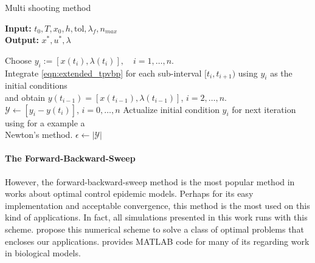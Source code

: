 \begin{algorithm}
  \caption{Multi shooting method } \label{alg:multishooting}
  \begin{flushleft}
    \hspace*{\algorithmicindent} \textbf{Input:} 
    $t_0, T, x_0, h, \text{tol}, \lambda_{f}, n_{max}$ \\
    \hspace*{\algorithmicindent} \textbf{Output:} 
    $x^*, u^*, \lambda$
  \end{flushleft}
  \begin{algorithmic}
        \State 
         Choose $y_i := [x(t_i ), \lambda(t_i )], \quad i = 1,\dots, n$.
        \\
        \State 
          Integrate \eqref{eqn:extended_tpvbp} for each sub-interval 
          $[t_i , t_{i+1})$ using $y_i$ as the initial conditions 
          \\
          \hspace{.98cm}
          and obtain 
          $y(t_{i−1}) = [x(t_{i−1}), \lambda(t_{i−1})]$, 
          $i=2, \dots, n$.
        \\
        \State 
          $\mathcal{Y} \gets [y_i - y(t_i)]$, $i=0, \dots, n$
        \State
          Actualize initial condition $y_i$ for next iteration
          using for a example a
          \\
          \hspace{.98cm}
           Newton's method.
        \State
          $\epsilon \gets |\mathcal{Y}|$  
      \EndWhile
     \EndProcedure
  \end{algorithmic}
\end{algorithm}

\paragraph{The Forward-Backward-Sweep}
  However, the forward-backward-sweep method is the most popular method in 
  works about optimal control epidemic models. Perhaps for its easy 
  implementation and acceptable convergence, this method is the most used
  on this kind of applications. In fact, all simulations presented in this work
  runs with this scheme. \citet{hackbusch1978numerical} propose this numerical
  scheme to solve a class of optimal problems that encloses our applications.
  \citet{lenhart2007optimal} provides MATLAB code for many of its regarding
  work in biological models.

